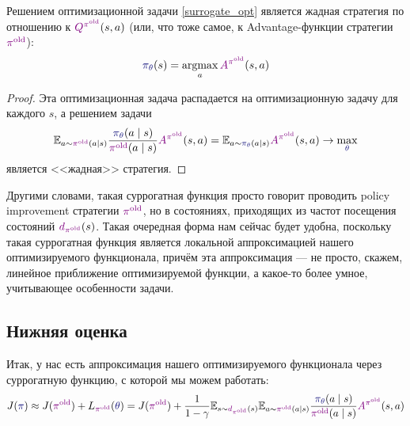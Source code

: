 \begin{proposition}\label{prop:surrogateoptispi}
Решением оптимизационной задачи \eqref{surrogate_opt} является жадная стратегия по отношению к $\textcolor{ChadPurple}{Q^{\pi^{\old}}}(s, a)$ (или, что тоже самое, к Advantage-функции стратегии $\textcolor{ChadPurple}{\pi^{\old}}$):
$$\textcolor{ChadBlue}{\pi_\theta}(s) = \argmax_{a} \textcolor{ChadPurple}{A^{\pi^{\old}}}(s, a)$$

\begin{proof}
Эта оптимизационная задача распадается на оптимизационную задачу для каждого $s$, а решением задачи
$$\E_{a \sim \textcolor{ChadPurple}{\pi^{\old}}(a \mid s)} \frac{\textcolor{ChadBlue}{\pi_\theta}(a \mid s)}{\textcolor{ChadPurple}{\pi^{\old}}(a \mid s)} \textcolor{ChadPurple}{A^{\pi^{\old}}}(s, a) = \E_{a \sim \textcolor{ChadBlue}{\pi_\theta}(a \mid s)} \textcolor{ChadPurple}{A^{\pi^{\old}}}(s, a) \to \max_{\textcolor{ChadBlue}{\theta}}$$
является <<жадная>> стратегия.
\end{proof}
\end{proposition}

Другими словами, такая суррогатная функция просто говорит проводить policy improvement стратегии $\textcolor{ChadPurple}{\pi^{\old}}$, но в состояниях, приходящих из частот посещения состояний $\textcolor{ChadPurple}{d_{\pi^{\old}}}(s)$. Такая очередная форма нам сейчас будет удобна, поскольку такая суррогатная функция является локальной аппроксимацией нашего оптимизируемого функционала, причём эта аппроксимация --- не просто, скажем, линейное приближение оптимизируемой функции, а какое-то более умное, учитывающее особенности задачи. 

\subsection{Нижняя оценка}

Итак, у нас есть аппроксимация нашего оптимизируемого функционала через суррогатную функцию, с которой мы можем работать:
$$J(\textcolor{ChadBlue}{\pi}) \approx J(\textcolor{ChadPurple}{\pi^{\old}}) + L_{\textcolor{ChadPurple}{\pi^{\old}}}(\textcolor{ChadBlue}{\theta}) = J(\textcolor{ChadPurple}{\pi^{\old}}) + \frac{1}{1 - \gamma}\E_{s \sim \textcolor{ChadPurple}{d_{\pi^{\old}}}(s)} \E_{a \sim \textcolor{ChadPurple}{\pi^{\old}}(a \mid s)} \frac{\textcolor{ChadBlue}{\pi_\theta}(a \mid s)}{\textcolor{ChadPurple}{\pi^{\old}}(a \mid s)} \textcolor{ChadPurple}{A^{\pi^{\old}}}(s, a)$$

